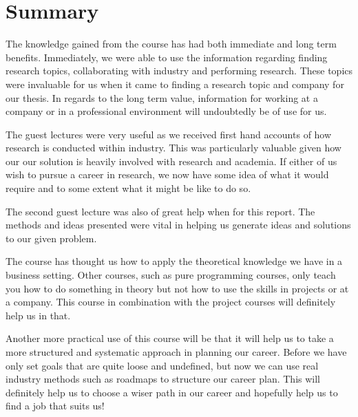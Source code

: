 \documentclass{article}
\begin{document}
\section{Summary}
The knowledge gained from the course has had both immediate and long term benefits. Immediately, we were able to use the information regarding finding research topics, collaborating with industry and performing research. These topics were invaluable for us when it came to finding a research topic and company for our thesis. In regards to the long term value, information for working at a company or in a professional environment will undoubtedly be of use for us. 

The guest lectures were very useful as we received first hand accounts of how research is conducted within industry. This was particularly valuable given how our our solution is heavily involved with research and academia. If either of us wish to pursue a career in research, we now have some idea of what it would require and to some extent what it might be like to do so.

The second guest lecture was also of great help when for this report. The methods and ideas presented were vital in helping us generate ideas and solutions to our given problem.

The course has thought us how to apply the theoretical knowledge we have in a business setting. Other courses, such as pure programming courses, only teach you how to do something in theory but not how to use the skills in projects or at a company. This course in combination with the project courses will definitely help us in that. 

Another more practical use of this course will be that it will help us to take a more structured and systematic approach in planning our career. Before we have only set goals that are quite loose and undefined, but now we can use real industry methods such as roadmaps to structure our career plan. This will definitely help us to choose a wiser path in our career and hopefully help us to find a job that suits us! 





\end{document}
